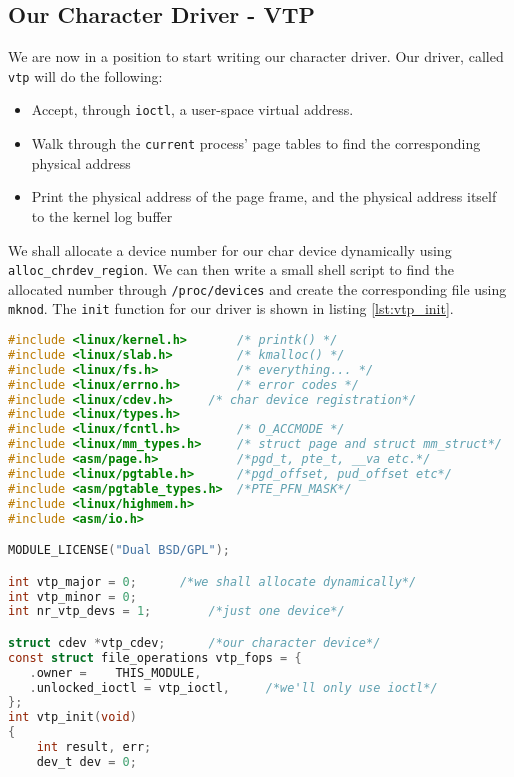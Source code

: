 \documentclass[a4paper,10pt]{article}
\begin{document}
\begin{flushleft}
\section{Our Character Driver - VTP}

We are now in a position to start writing our character driver. Our driver, called \verb|vtp| will do the following:

\begin{itemize}
 \item Accept, through \verb|ioctl|, a user-space virtual address.
 \item Walk through the \verb|current| process' page tables to find the corresponding physical address
 \item Print the physical address of the page frame, and the physical address itself to the kernel log buffer
\end{itemize}

We shall allocate a device number for our char device dynamically using \verb|alloc_chrdev_region|. We can then write a small shell script
to find the allocated number through \verb|/proc/devices| and create the corresponding file using \verb|mknod|. The \verb|init| function for
our driver is shown in listing \ref{lst:vtp_init}.\\

\begin{lstlisting}[caption={The init function},label={lst:vtp_init},language=C, style=mystyle]
#include <linux/kernel.h>       /* printk() */
#include <linux/slab.h>         /* kmalloc() */
#include <linux/fs.h>           /* everything... */
#include <linux/errno.h>        /* error codes */
#include <linux/cdev.h>		/* char device registration*/
#include <linux/types.h> 
#include <linux/fcntl.h>        /* O_ACCMODE */
#include <linux/mm_types.h>     /* struct page and struct mm_struct*/
#include <asm/page.h>           /*pgd_t, pte_t, __va etc.*/
#include <linux/pgtable.h>      /*pgd_offset, pud_offset etc*/
#include <asm/pgtable_types.h>  /*PTE_PFN_MASK*/
#include <linux/highmem.h>
#include <asm/io.h>

MODULE_LICENSE("Dual BSD/GPL");

int vtp_major = 0;		/*we shall allocate dynamically*/
int vtp_minor = 0;
int nr_vtp_devs = 1;		/*just one device*/

struct cdev *vtp_cdev;		/*our character device*/
const struct file_operations vtp_fops = {
   .owner =    THIS_MODULE,
   .unlocked_ioctl = vtp_ioctl,		/*we'll only use ioctl*/
};
int vtp_init(void)
{
	int result, err;
	dev_t dev = 0;
	

\end{lstlisting}
\end{flushleft}
\end{document}

